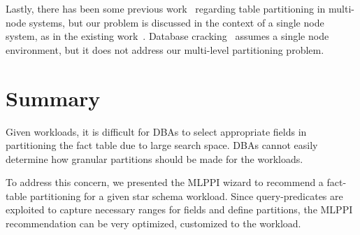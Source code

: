 \documentclass[runningheads]{comsis2}
\begin{document}

Lastly, there has been some previous work~\cite{nehme2011automated,rao2002automating,tatarowicz2012lookup} 
regarding table partitioning in multi-node \hbox{systems}, but 
our problem is discussed in the context of a single node system, as in the existing work~\cite{agrawal04:integrating}. 
Database cracking~\cite{idreoskm07}
assumes a single node environment, but 
it does not address our multi-level partitioning problem. 

\section{Summary}
\label{sec:conclusion}

Given workloads, it is difficult for DBAs to select appropriate fields 
in partitioning the fact table due to large search space. 
DBAs cannot easily determine how granular partitions should be made 
for the workloads. 

To address this concern, we presented the MLPPI wizard to recommend a fact-table partitioning for a given star schema workload. 
Since \hbox{query-predicates} are exploited 
to capture necessary ranges for fields and define partitions, 
the MLPPI \hbox{recommendation} can be very optimized, customized to the workload.  
\end{document}

